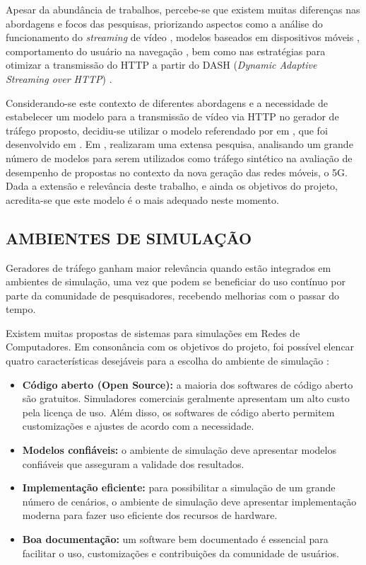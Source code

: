 Apesar da abundância de trabalhos, percebe-se que existem muitas diferenças nas abordagens e focos das pesquisas, priorizando aspectos como a análise do funcionamento do \textit{streaming} de vídeo \cite{Ramos-munoz2014} \cite{Ragimova2019}, modelos baseados em dispositivos móveis \cite{Fang2016}, comportamento do usuário na navegação \cite{Tsompanidis2014} \cite{Zhao2013}, bem como nas estratégias para otimizar a transmissão do HTTP a partir do DASH (\textit{Dynamic Adaptive Streaming over HTTP})  \cite{Waldmann2017}. 

Considerando-se este contexto de diferentes abordagens e a necessidade de estabelecer um modelo para a transmissão de vídeo via HTTP no gerador de tráfego proposto, decidiu-se utilizar o modelo referendado por  em \cite{Navarro-Ortiz2020}, que foi desenvolvido em \cite{Zhao2013}. Em \cite{Navarro-Ortiz2020},  realizaram uma extensa pesquisa, analisando um grande número de modelos para serem utilizados como tráfego sintético na avaliação de desempenho de propostas no contexto da nova geração das redes móveis, o 5G. Dada a extensão e relevância deste trabalho, e ainda os objetivos do projeto, acredita-se que este modelo é o mais adequado neste momento.

\subsection{AMBIENTES DE SIMULAÇÃO}

Geradores de tráfego ganham maior relevância quando estão integrados em ambientes de simulação, uma vez que podem se beneficiar do uso contínuo por parte da comunidade de pesquisadores, recebendo melhorias com o passar do tempo.

Existem muitas propostas de sistemas para simulações em Redes de Computadores. Em consonância com os objetivos do projeto, foi possível elencar quatro características desejáveis para a escolha do ambiente de simulação \cite{SaulodaMata2017}: 
\begin{itemize}
	\item \textbf{Código aberto (Open Source):} a maioria dos softwares de código aberto são gratuitos. Simuladores comerciais geralmente apresentam um alto custo pela licença de uso. Além disso, os softwares de código aberto permitem customizações e ajustes de acordo com a necessidade.
	\item \textbf{Modelos confiáveis:} o ambiente de simulação deve apresentar modelos confiáveis que asseguram a validade dos resultados.
	\item \textbf{Implementação eficiente:} para possibilitar a simulação de um grande número de cenários, o ambiente de simulação deve apresentar implementação moderna para fazer uso eficiente dos recursos de hardware.
	\item \textbf{Boa documentação:} um software bem documentado é essencial para facilitar o uso, customizações e contribuições da comunidade de usuários.
\end{itemize}

